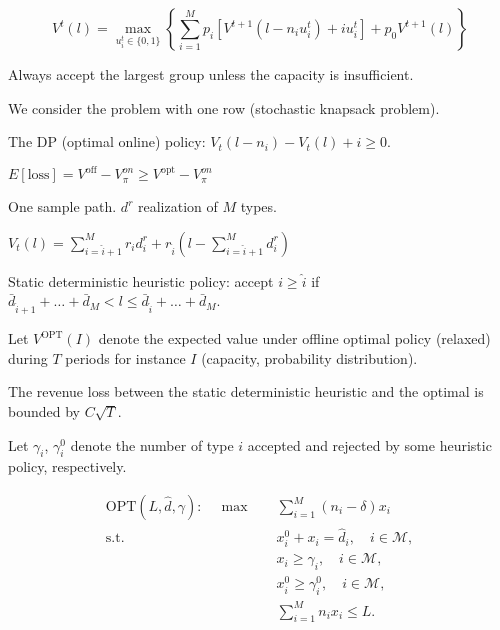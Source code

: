 \begin{equation}
    V^{t}(l) =  \max_{u_{i}^{t} \in \{0,1\}} \left\{ \sum_{i=1}^{M} p_i \left[V^{t+1}(l-n_i u_{i}^{t})+ i u_{i}^{t}\right] + p_0 V^{t+1}(l)\right\}
\end{equation}

Always accept the largest group unless the capacity is insufficient.


We consider the problem with one row (stochastic knapsack problem).

The DP (optimal online) policy: $V_{t}(l- n_{i}) - V_{t}(l) + i \geq 0$.

$E[\text{loss}] = V^{\text{off}} - V_{\pi}^{on} \geq V^{\text{opt}} - V_{\pi}^{on}$

One sample path. $d^{r}$ realization of $M$ types. 

$V_{t}(l) = \sum_{i = \hat{i}+1}^{M} r_{i} d_{i}^{r} + r_{\hat{i}}(l- \sum_{i= \hat{i}+1}^{M} d_{i}^{r})$

Static deterministic heuristic policy: accept $i \geq \hat{i}$ if $\bar{d}_{\hat{i}+1}+ \ldots + \bar{d}_{M} < l \leq \bar{d}_{\hat{i}}+ \ldots + \bar{d}_{M}$.


Let $V^{\text{OPT}}(I)$ denote the expected value under offline optimal policy (relaxed) during $T$ periods for instance $I$ (capacity, probability distribution).

The revenue loss between the static deterministic heuristic and the optimal is bounded by $C \sqrt{T}$.

Let $\gamma_{i}$, $\gamma_{i}^{0}$ denote the number of type $i$ accepted and rejected by some heuristic policy, respectively.



\begin{align*}
    \text{OPT}(L, \hat{d}, \gamma): \quad \max \quad & \sum_{i = 1}^{M} (n_i - \delta) x_{i} \\
    \text {s.t.} \quad & x_{i}^{0} + x_{i} = \hat{d}_{i}, \quad i \in \mathcal{M},  \\ 
    & x_{i} \geq \gamma_{i}, \quad i \in \mathcal{M}, \\
    & x_{i}^{0} \geq \gamma_{i}^{0}, \quad i \in \mathcal{M}, \\
    & \sum_{i=1}^{M} n_{i} x_{i} \leq L.
\end{align*}

